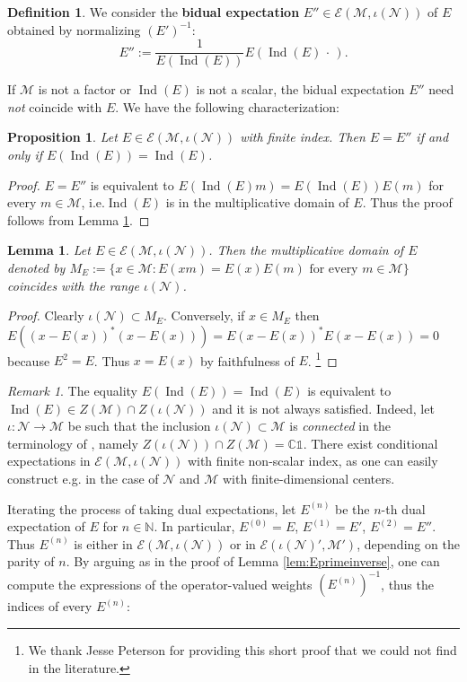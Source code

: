 \documentclass[11pt,a4paper]{article}
\makeatletter
\newcommand{\oneop}{\mathds{1}}
\newcommand{\slot}{{\,\cdot \,}}
\newcommand{\E}{\mathcal{E}}
\newcommand{\M}{\mathcal{M}}
\newcommand{\N}{\mathcal{N}}
\newcommand{\CC}{\mathbb{C}}
\newcommand{\NN}{\mathbb{N}}
\DeclareMathOperator{\Ind}{Ind}
\DeclareRobustCommand{\eg}{e.g.\@\xspace}
\DeclareRobustCommand{\ie}{i.e.\@\xspace}
\theoremstyle{plain}
\newtheorem{lem}[thm]{Lemma}
\newtheorem{prop}[thm]{Proposition}
\theoremstyle{definition}
\newtheorem{defi}[thm]{Definition}
\theoremstyle{remark}
\newtheorem{rmk}[thm]{Remark}
\numberwithin{equation}{section}%
\makeatother
\begin{document}
\begin{defi}
We consider the \textbf{bidual expectation} $E'' \in \E(\M,\iota(\N))$ of $E$ obtained by normalizing $(E')^{-1}$:
$$E'' := \frac{1}{E(\Ind(E))} E(\Ind(E) \slot).$$
\end{defi}

If $\M$ is not a factor or $\Ind(E)$ is not a scalar, the bidual expectation $E''$ need \emph{not} coincide with $E$. We have the following characterization:

\begin{prop}\label{prop:bidual}
Let $E\in \E(\M,\iota(\N))$ with finite index. Then $E = E''$ if and only if $E(\Ind(E)) = \Ind(E)$.
\end{prop}

\begin{proof}
$E = E''$ is equivalent to $E(\Ind(E)m) = E(\Ind(E)) E(m)$ for every $m\in\M$, \ie $\Ind(E)$ is in the multiplicative domain of $E$. Thus the proof follows from Lemma \ref{lem:multdomainE}.
\end{proof}

\begin{lem}\label{lem:multdomainE}
Let $E\in \E(\M,\iota(\N))$. Then the multiplicative domain of $E$ \emph{\cite{Cho74}} denoted by $M_E := \{x\in\M: E(xm) = E(x)E(m) \text{ for every }m\in\M\}$ coincides with the range $\iota(\N)$. 
\end{lem}

\begin{proof}
Clearly $\iota(\N) \subset M_E$. Conversely, if $x\in M_E$ then $E((x-E(x))^*(x-E(x))) = E(x-E(x))^*E(x-E(x)) = 0$ because $E^2 = E$. Thus $x = E(x)$ by faithfulness of $E$. 
\footnote{We thank Jesse Peterson for providing this short proof that we could not find in the literature.}
\end{proof}

\begin{rmk}
The equality $E(\Ind(E)) = \Ind(E)$ is equivalent to $\Ind(E)\in Z(\M)\cap Z(\iota(\N))$ and it is not always satisfied. Indeed, let $\iota:\N\to\M$ be such that the inclusion $\iota(\N)\subset\M$ is \emph{connected} in the terminology of \cite{GHJ89}, namely $Z(\iota(\N))\cap Z(\M) = \CC\oneop$.
There exist conditional expectations in $\E(\M,\iota(\N))$ with finite non-scalar index, as one can easily construct \eg in the case of $\N$ and $\M$ with finite-dimensional centers.
\end{rmk}

Iterating the process of taking dual expectations, let $E^{(n)}$ be the $n$-th dual expectation of $E$ for $n\in\NN$. In particular, $E^{(0)} = E$, $E^{(1)} = E'$, $E^{(2)} = E''$. Thus $E^{(n)}$ is either in $\E(\M,\iota(\N))$ or in $\E(\iota(\N)',\M')$, depending on the parity of $n$. 
By arguing as in the proof of Lemma \ref{lem:Eprimeinverse}, one can compute the expressions of the operator-valued weights $(E^{(n)})^{-1}$, thus the indices of every $E^{(n)}$:
\end{document}
